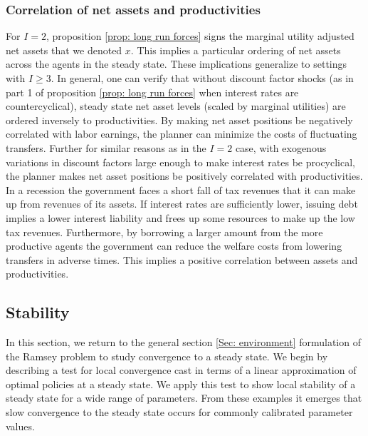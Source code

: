 \documentclass[thmsb,11pt]{article}
\begin{document}
\subsubsection{Correlation of net assets and productivities}
For $I=2$, proposition \ref{prop: long run forces}  signs the marginal utility adjusted net assets that we denoted  $x$. This implies a particular ordering of net assets across the agents in the steady state. These implications generalize to settings with $I\geq3$. In general, one can verify that without discount factor shocks (as in  part 1 of proposition \ref{prop: long run forces} when interest rates are countercyclical), steady state net asset  levels (scaled by marginal utilities) are ordered inversely to productivities. By making  net asset positions be negatively correlated with labor earnings, the planner can minimize the costs of fluctuating transfers. Further for similar reasons as in the $I=2$ case,  with exogenous variations in discount factors large enough to make interest rates be procyclical,  the planner makes net asset positions be positively correlated with productivities. In a recession the government faces a short fall of tax revenues that it can make up from revenues of its assets. If 
interest rates are sufficiently lower, issuing debt implies a lower interest liability and frees up some resources to make up the low tax revenues. Furthermore, by borrowing a larger amount from the more productive agents the government can reduce the welfare costs from lowering transfers in adverse times. This implies a positive correlation between assets and productivities.


\subsection{Stability}
In this section, we return to the general section \ref{Sec: environment} formulation of the Ramsey problem  to study convergence to a steady state. We begin by describing a test for local convergence cast in terms of a linear approximation of optimal policies at a steady state. We apply this test to show local stability of a steady state for a wide range of parameters. From these examples it emerges that slow convergence to the steady state occurs for  commonly calibrated parameter values.
\end{document}
